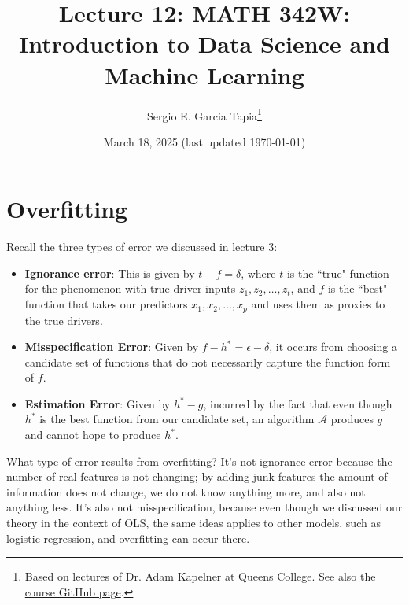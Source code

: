 \documentclass[12pt, a4paper]{article}
\title{Lecture 12: MATH 342W: Introduction to Data Science and Machine Learning}
\author{Sergio E. Garcia Tapia\thanks{Based on lectures of Dr. Adam Kapelner at Queens College.
See also the \href{https://github.com/kapelner/QC_MATH_342W_Spring_2025}{course GitHub page}.}}
\date{March 18, 2025 (last updated \today)}
\theoremstyle{definition}
\begin{document}
	\maketitle
	\section*{Overfitting}
	Recall the three types of error we discussed in lecture 3:
	\begin{itemize}
		\item \textbf{Ignorance error}: This is given by $t-f=\delta$, where $t$ is the ``true"
		function for the phenomenon with true driver inputs $z_1,z_2,\ldots,z_t$,
		and $f$ is the ``best" function that takes our predictors $x_1,x_2,\ldots,x_p$
		and uses them as proxies to the true drivers. 
		\item \textbf{Misspecification Error}: Given by $f-h^*=\epsilon-\delta$, it occurs
		from choosing a candidate set of functions that do not necessarily capture
		the function form of $f$.
		\item \textbf{Estimation Error}: Given by $h^*-g$, incurred by the fact that
		even though $h^*$ is the best function from our candidate set, an algorithm
		$\mathcal{A}$ produces $g$ and cannot hope to produce $h^*$.
	\end{itemize}
	What type of error results from overfitting? It's not ignorance error because
	the number of real features is not changing; by adding junk features the amount
	of information does not change, we do not know anything more, and also not
	anything less. It's also not misspecification, because even though we discussed
	our theory in the context of OLS, the same ideas applies to other models, such
	as logistic regression, and overfitting can occur there.
	
\end{document}
